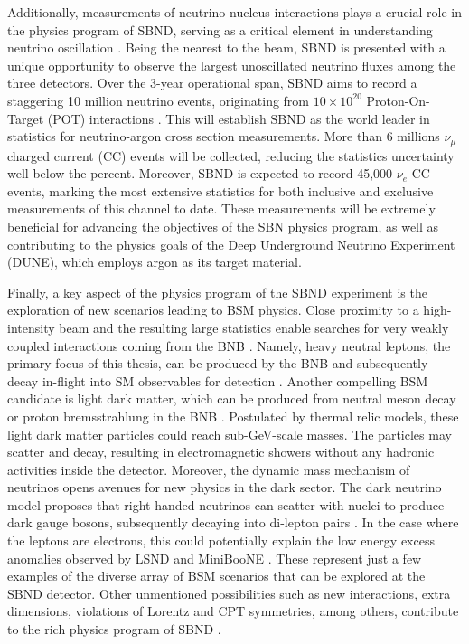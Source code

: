 Additionally, measurements of neutrino-nucleus interactions plays a crucial role in the physics program of SBND, serving as a critical element in understanding neutrino oscillation \cite{NuSTECWhitePaper}. 
Being the nearest to the beam, SBND is presented with a unique opportunity to observe the largest unoscillated neutrino fluxes among the three detectors.
Over the 3-year operational span, SBND aims to record a staggering 10 million neutrino events, originating from $10 \times 10^{20}$ Proton-On-Target (POT) interactions \cite{SBNProgram}.
This will establish SBND as the world leader in statistics for neutrino-argon cross section measurements.
More than 6 millions $\nu_{\mu}$ charged current (CC) events will be collected, reducing the statistics uncertainty well below the percent.
Moreover, SBND is expected to record 45,000 $\nu_{e}$ CC events, marking the most extensive statistics for both inclusive and exclusive measurements of this channel to date.
These measurements will be extremely beneficial for advancing the objectives of the SBN physics program, as well as contributing to the physics goals of the Deep Underground Neutrino Experiment (DUNE), which employs argon as its target material.

Finally, a key aspect of the physics program of the SBND experiment is the exploration of new scenarios leading to BSM physics. 
Close proximity to a high-intensity beam and the resulting large statistics enable searches for very weakly coupled interactions coming from the BNB \cite{SBNProgram}.
Namely, heavy neutral leptons, the primary focus of this thesis, can be produced by the BNB and subsequently decay in-flight into SM observables for detection \cite{SBNHNL}.
Another compelling BSM candidate is light dark matter, which can be produced from neutral meson decay or proton bremsstrahlung in the BNB \cite{LightDarkMatter}. 
Postulated by thermal relic models, these light dark matter particles could reach sub-GeV-scale masses. 
The particles may scatter and decay, resulting in electromagnetic showers without any hadronic activities inside the detector.
Moreover, the dynamic mass mechanism of neutrinos opens avenues for new physics in the dark sector. 
The dark neutrino model proposes that right-handed neutrinos can scatter with nuclei to produce dark gauge bosons, subsequently decaying into di-lepton pairs \cite{DarkNeutrino}. 
In the case where the leptons are electrons, this could potentially explain the low energy excess anomalies observed by LSND and MiniBooNE \cite{DarkNeutrinoLEE}.
These represent just a few examples of the diverse array of BSM scenarios that can be explored at the SBND detector. 
Other unmentioned possibilities such as new interactions, extra dimensions, violations of Lorentz and CPT symmetries, among others, contribute to the rich physics program of SBND \cite{SBNProgram}.

